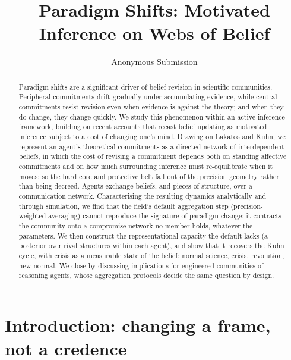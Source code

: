 \documentclass[runningheads]{llncs}
\title{Paradigm Shifts: Motivated Inference on Webs of Belief}
\author{Anonymous Submission}
\institute{Anonymous Institution(s)}
\begin{document}
\maketitle

\begin{abstract}
Paradigm shifts are a significant driver of belief revision in scientific communities.
Peripheral commitments drift gradually under accumulating evidence, while central commitments
resist revision even when evidence is against the theory; and when they do change, they
change quickly. We study this phenomenon within an active inference framework, building on
recent accounts that recast belief updating as motivated inference subject to a cost of
changing one's mind. Drawing on Lakatos and Kuhn, we represent an agent's theoretical
commitments as a directed network of interdependent beliefs, in which the cost of revising a
commitment depends both on standing affective commitments and on how much surrounding
inference must re-equilibrate when it moves; so the hard core and protective belt fall out
of the precision geometry rather than being decreed. Agents exchange beliefs, and pieces of
structure, over a communication network. Characterising the resulting dynamics analytically
and through simulation, we find that the field's default aggregation step (precision-weighted
averaging) cannot reproduce the signature of paradigm change: it contracts the community onto
a compromise network no member holds, whatever the parameters. We then construct the
representational capacity the default lacks (a posterior over rival structures within each
agent), and show that it recovers the Kuhn cycle, with crisis as a measurable state of the
belief: normal science, crisis, revolution, new normal. We close by discussing implications
for engineered communities of reasoning agents, whose aggregation protocols decide the same
question by design.

\end{abstract}

\section{Introduction: changing a frame, not a credence}
\label{sec:background}
\end{document}
